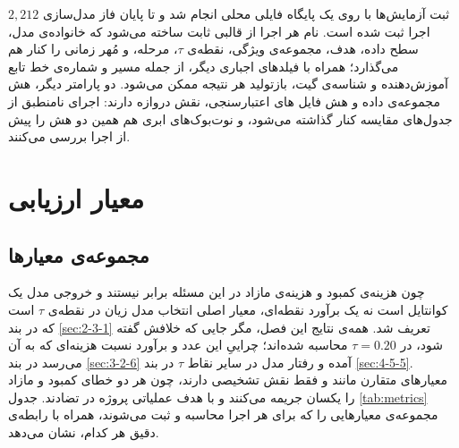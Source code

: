 ثبت آزمایش‌ها با  روی یک پایگاه فایلی محلی انجام شد و تا پایان فاز
مدل‌سازی $2{,}212$ اجرا ثبت شده است. نام هر اجرا از قالبی ثابت ساخته می‌شود که
خانواده‌ی مدل، سطح داده، هدف، مجموعه‌ی ویژگی، نقطه‌ی $\tau$، مرحله،  و
مُهر زمانی را کنار هم می‌گذارد؛ همراه با فیلدهای اجباری دیگر، از جمله مسیر و
شماره‌ی خط تابع آموزش‌دهنده و شناسه‌ی  گیت، بازتولید هر نتیجه ممکن
می‌شود. دو پارامتر دیگر، هش مجموعه‌ی داده و هش فایل های اعتبارسنجی،
نقش دروازه دارند: اجرای نامنطبق از جدول‌های مقایسه کنار گذاشته می‌شود، و
نوت‌بوک‌های ابری هم همین دو هش را پیش از اجرا بررسی می‌کنند.

\section{معیار ارزیابی}
\label{sec:4-3}

\subsection{مجموعه‌ی معیارها}
\label{sec:4-3-1}

چون هزینه‌ی کمبود و هزینه‌ی مازاد در این مسئله برابر نیستند و خروجی مدل یک کوانتایل است
نه یک برآورد نقطه‌ای، معیار اصلی انتخاب مدل زیان  در نقطه‌ی $\tau$ است که در
بند \ref{sec:2-3-1} تعریف شد. همه‌ی نتایج این فصل، مگر جایی که خلافش گفته شود، در
$\tau = 0.20$ محاسبه شده‌اند؛ چراییِ این عدد و برآورد نسبت هزینه‌ای که به آن می‌رسد در
بند \ref{sec:3-2-6} آمده و رفتار مدل در سایر نقاط $\tau$ در بند \ref{sec:4-5-5}. معیارهای
متقارن مانند  و  فقط نقش تشخیصی دارند، چون هر دو خطای کمبود و مازاد را
یکسان جریمه می‌کنند و با هدف عملیاتی پروژه در تضادند. جدول \ref{tab:metrics} مجموعه‌ی
معیارهایی را که برای هر اجرا محاسبه و ثبت می‌شوند، همراه با رابطه‌ی دقیق هر کدام، نشان
می‌دهد.

